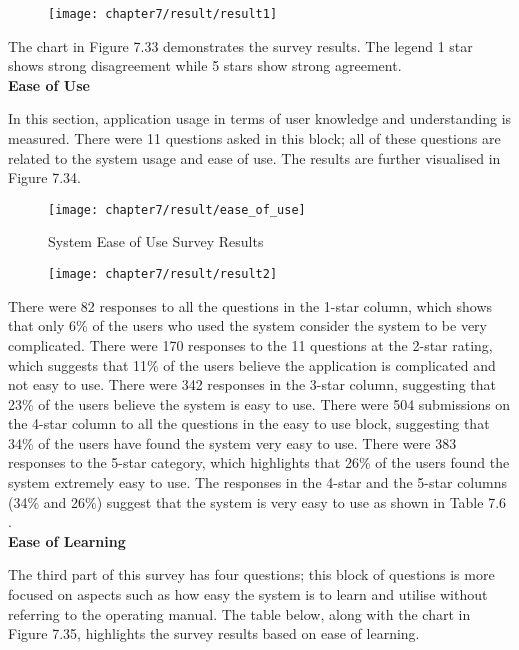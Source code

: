 \begin{figure}
\centering
\texttt{[image: chapter7/result/result1]}
\end{figure}

The chart in Figure 7.33  demonstrates the survey results. The legend 1 star shows strong disagreement while 5 stars show strong agreement. \\

\textbf{Ease of Use}

In this section, application usage in terms of user knowledge and understanding is measured. There were 11 questions asked in this block; all of these questions are related to the system usage and ease of use. The results are further visualised in Figure 7.34.\\

\begin{figure}
\centering
\texttt{[image: chapter7/result/ease\_of\_use]}
\caption{System Ease of Use Survey Results}
\end{figure}

\begin{figure}
\centering
\texttt{[image: chapter7/result/result2]}
\end{figure}

There were 82 responses to all the questions in the 1-star column, which shows that only 6\% of the users who used the system consider the system to be very complicated. There were 170 responses to the 11 questions at the 2-star rating, which suggests that 11\% of the users believe the application is complicated and not easy to use. There were 342 responses in the 3-star column,  suggesting that 23\% of the users believe the system is easy to use. There were 504 submissions on the 4-star column to all the questions in the easy to use block, suggesting that 34\% of the users have found the system very easy to use. There were 383 responses to the 5-star category, which highlights that 26\% of the users found the system extremely easy to use. The responses in the 4-star and the 5-star columns (34\% and 26\%) suggest that the system is very easy to use as shown in Table 7.6 .\\

\textbf{Ease of Learning}

The third part of this survey has four questions; this block of questions is more focused on aspects such as how easy the system is to learn and utilise without referring to the operating manual. The table below, along with the chart in Figure 7.35, highlights the survey results based on ease of learning. \\

